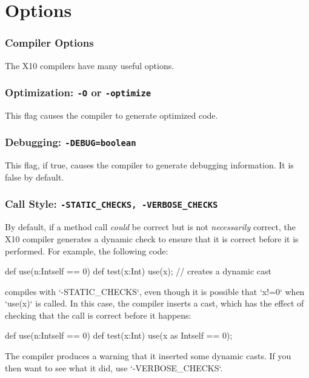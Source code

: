 \chapter{Options}

\subsection{Compiler Options}

The X10 compilers have many useful options. 


\subsection{Optimization: {\tt -O} or {\tt -optimize}}

This flag causes the compiler to generate optimized code.


\subsection{Debugging: {\tt -DEBUG=boolean}}

This flag, if true, causes the compiler to generate debugging information.  It
is false by default.

\subsection{Call Style: {\tt -STATIC\_CHECKS, -VERBOSE\_CHECKS}}

By default, if a method call {\em could} be correct but is not {\em
necessarily} correct, the X10 compiler generates a dynamic check to ensure
that it is correct before it is performed.  For example, the following code: 
\begin{xten}
def use(n:Int{self == 0}) {}
def test(x:Int) { 
   use(x); // creates a dynamic cast
}
\end{xten}
compiles with \xcd`-STATIC_CHECKS`, even though it is possible that 
\xcd`x!=0` when \xcd`use(x)` is called.  In this case, the compiler inserts a
cast, which has the effect of checking that the call is correct before it
happens: 
\begin{xten}
def use(n:Int{self == 0}) {}
def test(x:Int) { 
   use(x as Int{self == 0}); 
}
\end{xten}
The compiler produces a warning that it inserted some dynamic casts.
If you then want to see what it did, use \xcd`-VERBOSE_CHECKS`.

